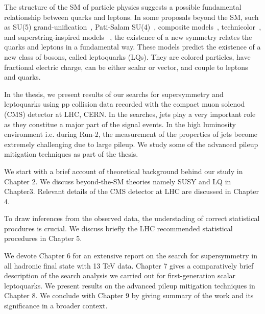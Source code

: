 The structure of the SM of particle physics suggests a possible fundamental relationship between quarks and leptons. In some proposals beyond the SM, such as SU(5) grand-unification~\cite{guts}, Pati-Salam SU(4)~\cite{LQ3}, composite models~\cite{composite}, technicolor~\cite{LQ1, LQ2, technicolor2, technicolor3}, and superstring-inspired models ~\cite{superstring_e6}, the existence of a new symmetry relates the quarks and leptons in a
fundamental way. These models predict the existence of a new class of bosons, called leptoquarks (LQs). They are 
colored particles, have fractional electric charge, can be either scalar or vector, and couple to leptons and quarks. 

In the thesis, we present results of our searchs for supersymmetry and leptoquarks using pp collision data recorded  with the compact muon solenod (CMS) detector at LHC, CERN. In the searches, jets play a very important role as they constitue a major part of the signal events. In the high luminosity environment i.e. during Run-2, the measurement of the properties of jets become extremely challenging due to large pileup. We  study some of the advanced pileup mitigation techniques as part of the thesis. 

  

We start with a brief account of  theoretical background behind our study in Chapter 2. We discuss beyond-the-SM  theories namely SUSY and LQ  in Chapter3. Relevant details of the CMS detector at LHC are discussed in Chapter 4. 

To draw inferences from the observed data, the understading of correct statistical procdures is crucial. We discuss briefly the LHC recommended statistical procedures in Chapter 5.

We devote Chapter 6 for an extensive report on the search for supersymmetry in all hadronic final state with 13 TeV data. Chapter 7 gives a comparatively brief description of the search analysis we carried out for first-generation scalar leptoquarks. We present results on the advanced pileup mitigation techniques in Chapter 8. We conclude with Chapter 9 by giving summary of the work and its significance in a broader context.


